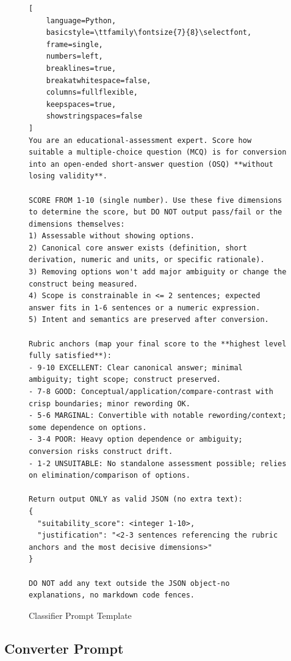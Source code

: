\begin{figure}[htbp]
\centering
\begin{scriptsize}
\begin{lstlisting}[
    language=Python,
    basicstyle=\ttfamily\fontsize{7}{8}\selectfont,
    frame=single,
    numbers=left,
    breaklines=true,
    breakatwhitespace=false,
    columns=fullflexible,
    keepspaces=true,
    showstringspaces=false
]
You are an educational-assessment expert. Score how suitable a multiple-choice question (MCQ) is for conversion into an open-ended short-answer question (OSQ) **without losing validity**.

SCORE FROM 1-10 (single number). Use these five dimensions to determine the score, but DO NOT output pass/fail or the dimensions themselves:
1) Assessable without showing options.
2) Canonical core answer exists (definition, short derivation, numeric and units, or specific rationale).
3) Removing options won't add major ambiguity or change the construct being measured.
4) Scope is constrainable in <= 2 sentences; expected answer fits in 1-6 sentences or a numeric expression.
5) Intent and semantics are preserved after conversion.

Rubric anchors (map your final score to the **highest level fully satisfied**):
- 9-10 EXCELLENT: Clear canonical answer; minimal ambiguity; tight scope; construct preserved.
- 7-8 GOOD: Conceptual/application/compare-contrast with crisp boundaries; minor rewording OK.
- 5-6 MARGINAL: Convertible with notable rewording/context; some dependence on options.
- 3-4 POOR: Heavy option dependence or ambiguity; conversion risks construct drift.
- 1-2 UNSUITABLE: No standalone assessment possible; relies on elimination/comparison of options.

Return output ONLY as valid JSON (no extra text):
{
  "suitability_score": <integer 1-10>,
  "justification": "<2-3 sentences referencing the rubric anchors and the most decisive dimensions>"
}

DO NOT add any text outside the JSON object-no explanations, no markdown code fences.

\end{lstlisting}
\end{scriptsize}
\caption{Classifier Prompt Template}
\label{app:classifier_prompt_template}
\end{figure}


\clearpage
\subsection{Converter Prompt}

